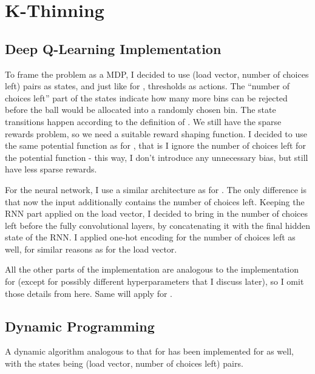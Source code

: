 

\section{K-Thinning}


\subsection{Deep Q-Learning Implementation}


To frame the \KThinning problem as a MDP, I decided to use (load vector, number of choices left) pairs as states, and just like for \TwoThinning, thresholds as actions. The ``number of choices left'' part of the states indicate how many more bins can be rejected before the ball would be allocated into a randomly chosen bin. The state transitions happen according to the definition of \KThinning {}. We still have the sparse rewards problem, so we need a suitable reward shaping function. I decided to use the same potential function as for \TwoThinning, that is I ignore the number of choices left for the potential function - this way, I don't introduce any unnecessary bias, but still have less sparse rewards. 


For the neural network, I use a similar architecture as for \TwoThinning. The only difference is that now the input additionally contains the number of choices left. Keeping the RNN part applied on the load vector, I decided to bring in the number of choices left before the fully convolutional layers, by concatenating it with the final hidden state of the RNN. I applied one-hot encoding for the number of choices left as well, for similar reasons as for the load vector.


All the other parts of the implementation are analogous to the implementation for \TwoThinning (except for possibly different hyperparameters that I discuss later), so I omit those details from here. Same will apply for \GraphicalTwoChoice.



\subsection{Dynamic Programming}


A dynamic algorithm analogous to that for \TwoThinning has been implemented for \KThinning as well, with the states being (load vector, number of choices left) pairs.


